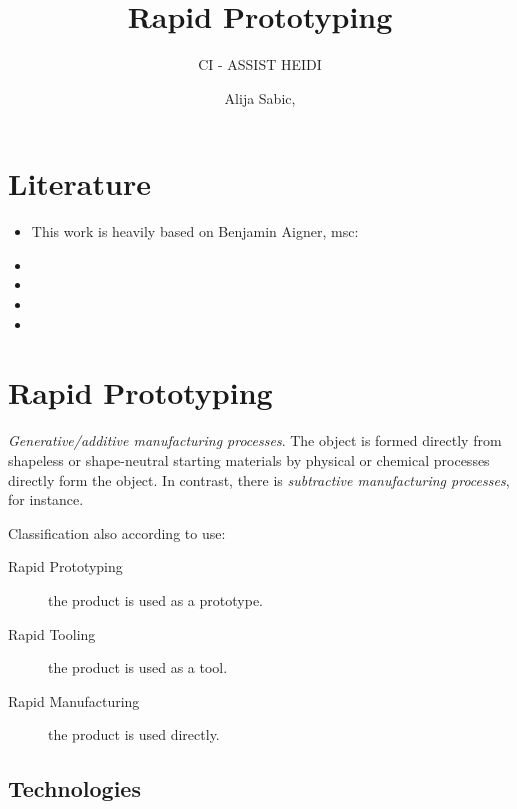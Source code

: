 \documentclass[aspectratio=169]{beamer}
\title[Rapid Prototyping]{Rapid Prototyping}
\subtitle{CI - ASSIST HEIDI}
\author{Alija Sabic, \glsentrytext{msc}}
\institute{Department Electronic Engineering}
\begin{document}
\begin{frame}[plain]
    \titlepage
\end{frame}

\section{Literature}
\begin{frame}
    \begin{itemize}
        \item This work is heavily based on Benjamin Aigner, \acs{msc}:\newline{}
        \item {}
        \item {}
        \item {}
        \item {}
    \end{itemize}
\end{frame}

\section{Rapid Prototyping}

\begin{frame}
    \par \textit{Generative/additive manufacturing processes}.
    The object is formed directly from shapeless or shape-neutral starting materials by physical or chemical processes directly form the object.
    In contrast, there is \textit{subtractive manufacturing processes}, for instance.
    \par Classification also according to use:
    \begin{description}
        \item[Rapid Prototyping] the product is used as a prototype.
        \item[Rapid Tooling] the product is used as a tool.
        \item[Rapid Manufacturing] the product is used directly.
    \end{description}
\end{frame}

\subsection{Technologies}
\end{document}
